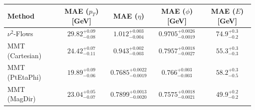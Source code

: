     \begin{tabular}{lcccc}
        \toprule
        Method & MAE ($p_T$) [GeV] & MAE ($\eta$) & MAE ($\phi$) [GeV] & MAE ($E$) [GeV] \\
        \midrule
        $\nu^2$-Flows & $29.82^{+0.09}_{-0.08}$ & $1.012^{+0.003}_{-0.004}$ & $0.9705^{+0.0026}_{-0.0019}$ & $74.9^{+0.3}_{-0.2}$ \\
        MMT (Cartesian) & $24.42^{+0.07}_{-0.11}$ & $0.943^{+0.002}_{-0.003}$ & $0.7957^{+0.0018}_{-0.0027}$ & $55.3^{+0.3}_{-0.3}$ \\
        MMT (PtEtaPhi) & $19.89^{+0.09}_{-0.06}$ & $0.7685^{+0.0022}_{-0.0019}$ & $0.766^{+0.003}_{-0.003}$ & $58.2^{+0.3}_{-0.5}$ \\
        MMT (MagDir) & $23.04^{+0.05}_{-0.07}$ & $0.7899^{+0.0013}_{-0.0020}$ & $0.7575^{+0.0018}_{-0.0021}$ & $49.9^{+0.2}_{-0.2}$ \\
        \bottomrule
    \end{tabular}